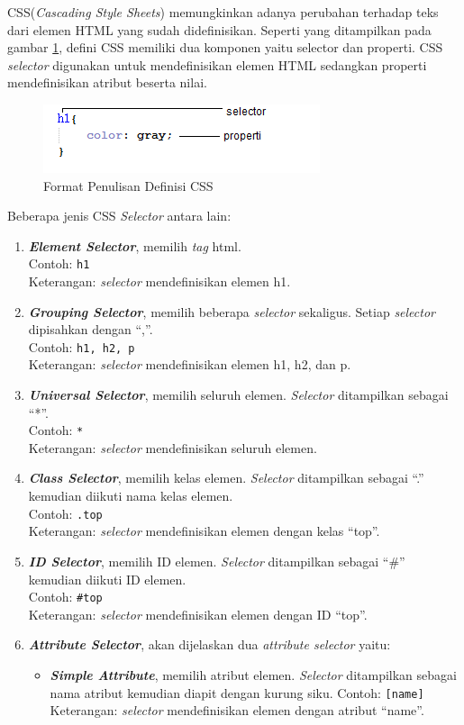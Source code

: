 \documentclass[a4paper,twoside]{article}
\begin{document}
\begin{enumerate}
\begin{enumerate}
CSS(\textit{Cascading Style Sheets}) memungkinkan adanya perubahan terhadap teks dari elemen HTML yang sudah didefinisikan\cite{Meyer:2012}. Seperti yang ditampilkan pada gambar \ref{fig:2_selector_ex}, defini CSS memiliki dua komponen yaitu selector dan properti. CSS \textit{selector} digunakan untuk mendefinisikan elemen HTML sedangkan properti mendefinisikan atribut beserta nilai. 
		\begin{figure}[H]
			\centering
			\includegraphics[scale=0.8]{Gambar/selector-ex}
			\caption{Format Penulisan Definisi CSS} 
			\label{fig:2_selector_ex}
		\end{figure}
Beberapa jenis CSS \textit{Selector} antara lain:
\begin{enumerate}
	\item \textit{\textbf{Element Selector}}, memilih \textit{tag} html.\\
		Contoh: \texttt{h1}\\
		Keterangan: \textit{selector} mendefinisikan elemen h1.
	\item \textit{\textbf{Grouping Selector}}, memilih beberapa \textit{selector} sekaligus. Setiap \textit{selector} dipisahkan dengan ``,''.\\
		Contoh: \texttt{h1, h2, p}\\
		Keterangan: \textit{selector} mendefinisikan elemen h1, h2, dan p.
	\item \textit{\textbf{Universal Selector}}, memilih seluruh elemen. \textit{Selector} ditampilkan sebagai ``*''.\\
		Contoh: \texttt{*}\\
		Keterangan: \textit{selector} mendefinisikan seluruh elemen.
	\item \textit{\textbf{Class Selector}}, memilih kelas elemen. \textit{Selector} ditampilkan sebagai ``.'' kemudian diikuti nama kelas elemen.\\
		Contoh: \texttt{.top}\\
		Keterangan: \textit{selector} mendefinisikan elemen dengan kelas ``top''.
	\item \textit{\textbf{ID Selector}}, memilih ID elemen. \textit{Selector} ditampilkan sebagai ``\#'' kemudian diikuti ID elemen.\\
		Contoh: \texttt{\#top}\\
		Keterangan: \textit{selector} mendefinisikan elemen dengan ID ``top''. 
	\item \textit{\textbf{Attribute Selector}}, akan dijelaskan dua \textit{attribute selector} yaitu:
		\begin{itemize}
			\item \textit{\textbf{Simple Attribute}}, memilih atribut elemen. \textit{Selector} ditampilkan sebagai nama atribut kemudian diapit dengan kurung siku.
			Contoh: \texttt{[name]}\\
			Keterangan: \textit{selector} mendefinisikan elemen dengan atribut ``name''. 
			

\end{itemize}
\end{enumerate}
\end{enumerate}
\end{enumerate}
\end{document}
